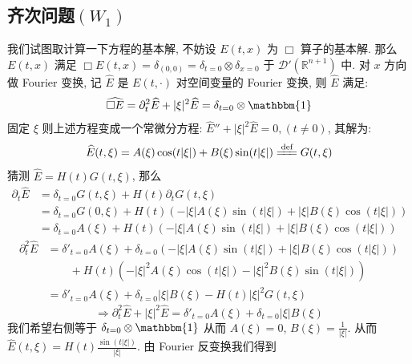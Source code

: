 \documentclass[11pt]{ctexart}[UTF8]
\begin{document}
\subsection{齐次问题$(W_{1})$}
我们试图取计算一下方程的基本解, 不妨设 $E(t,x)$ 为 $\Box$ 算子的基本解. 那么 $E(t,x)$ 满足 $\Box E(t,x) = \delta_{(0,0)} = \delta_{t=0}\otimes\delta_{x=0}$ 于 $\mathscr{D}'(\mathbb{R}^{n+1})$ 中. 
对 $x$ 方向做 Fourier 变换, 记 $\widehat{E}$ 是 $E(t,\cdot)$ 对空间变量的 Fourier 变换, 则 $\widehat{E}$ 满足:
\begin{equation*}
    \widehat{\Box E} = \partial_{t}^2 \widehat{E} + |\xi|^2 \widehat{E} = \delta_{t=0}\otimes \mathbbm{1}
\end{equation*}
固定 $\xi$ 则上述方程变成一个常微分方程: $\widehat{E}'' + |\xi|^2 \widehat{E} = 0,(t \neq 0)$, 其解为:
\begin{equation*}
    \widehat{E}(t,\xi) = A(\xi) \cos(t|\xi|) + B(\xi) \sin(t|\xi|) \xlongequal{\text{def}}G(t,\xi)
\end{equation*}
猜测 $\widehat{E} = H(t)G(t,\xi)$, 那么
\begin{equation*}
    \begin{aligned}
        \partial_{t}\widehat{E} &= \delta_{t=0}G(t,\xi) + H(t)\partial_{t}G(t,\xi)\\
                                &= \delta_{t=0}G(0,\xi) + H(t)\left(-|\xi|A(\xi)\sin(t|\xi|)+|\xi|B(\xi)\cos(t|\xi|)\right)\\
                                &= \delta_{t=0}A(\xi) + H(t)\left(-|\xi|A(\xi)\sin(t|\xi|)+|\xi|B(\xi)\cos(t|\xi|)\right)
    \end{aligned}
\end{equation*}
\begin{equation*}
    \begin{aligned}
        \partial_{t}^2 \widehat{E} &= \delta'_{t=0}A(\xi) + \delta_{t=0}\left(-|\xi|A(\xi)\sin(t|\xi|)+|\xi|B(\xi)\cos(t|\xi|)\right)\\
        &\quad\quad + H(t)\left(-|\xi|^2 A(\xi)\cos(t|\xi|)-|\xi|^2 B(\xi)\sin(t|\xi|)\right)\\
        &= \delta'_{t=0}A(\xi) + \delta_{t=0} |\xi| B(\xi) - H(t)|\xi|^2 G(t,\xi)
    \end{aligned}
\end{equation*}
\begin{equation*}
    \Longrightarrow \partial_{t}^2 \widehat{E} + |\xi|^2 \widehat{E} = \delta'_{t=0}A(\xi) + \delta_{t=0} |\xi| B(\xi)
\end{equation*}
我们希望右侧等于 $\delta_{t=0}\otimes \mathbbm{1}$ 从而 $A(\xi) = 0$, $B(\xi) = \frac{1}{|\xi|}$. 从而 $\widehat{E}(t,\xi) = H(t)\frac{\sin(t|\xi|)}{|\xi|}$. 由 Fourier 反变换我们得到
\end{document}
